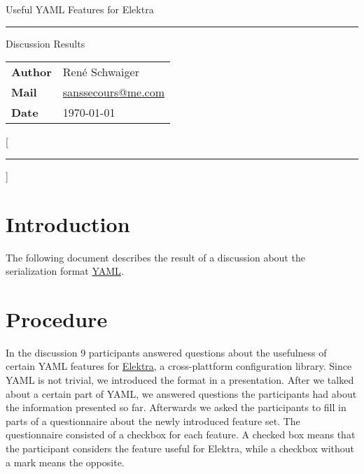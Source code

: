 \documentclass[a4paper, svgnames, 12pt]{article}
\makeatletter
\newcommand{\Title}{Useful YAML Features for Elektra}
\newcommand{\TitleDescription}{Discussion Results}
\newcommand{\Author}{René Schwaiger}
\newcommand{\Mail}{\href{mailto:sanssecours@me.com}{sanssecours@me.com}}
\makeatother
\begin{document}
\begin{titlepage}
  \begin{center}
    {\Huge\TitleFont\Title}
    \vskip 0.5cm
    {\color{Aqua}\hrule}
    \vskip 0.5cm
    {\Large\TitleDescription}
    \vskip 14cm
  \end{center}

  \vfill
  \begin{leftbar}
    \begin{tabular}{ll}
        \textbf{Author} & \Author\\
        \textbf{Mail}   & \Mail\\
        \textbf{Date}   & \today
    \end{tabular}
  \end{leftbar}
\end{titlepage}

\setcounter{page}{2}


{
  \titleformat{\section}{\sffamily\bfseries}{}{0pt}{}[{\color{Aqua}\hrule}]
  \tableofcontents
}


\section{Introduction}

The following document describes the result of a discussion about the serialization format \href{http://www.yaml.org}{YAML}.

\section{Procedure}

In the discussion 9 participants answered questions about the usefulness of certain YAML features for \href{https://www.libelektra.org}{Elektra}, a cross-plattform configuration library. Since YAML is not trivial, we introduced the format in a presentation. After we talked about a certain part of YAML, we answered questions the participants had about the information presented so far. Afterwards we asked the participants to fill in parts of a questionnaire about the newly introduced feature set. The questionnaire consisted of a checkbox for each feature. A checked box means that the participant considers the feature useful for Elektra, while a checkbox without a mark means the opposite.
\end{document}
